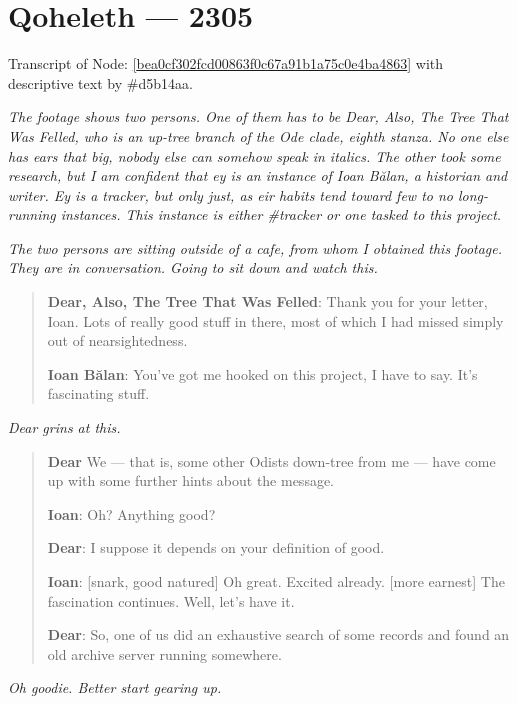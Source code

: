 \hypertarget{qoheleth-2305}{%
\chapter*{Qoheleth — 2305}\label{qoheleth-2305}}

Transcript of Node: \href{http://35.165.134.227/node/bea0cf302fcd00863f0c67a91b1a75c0e4ba4863}{{[}bea0cf302fcd00863f0c67a91b1a75c0e4ba4863{]}} with descriptive text by \#d5b14aa.

\emph{The footage shows two persons. One of them has to be Dear, Also, The Tree That Was Felled, who is an up-tree branch of the Ode clade, eighth stanza. No one else has ears that big, nobody else can somehow speak in italics. The other took some research, but I am confident that ey is an instance of Ioan Bălan, a historian and writer. Ey is a tracker, but only just, as eir habits tend toward few to no long-running instances. This instance is either \#tracker or one tasked to this project.}

\emph{The two persons are sitting outside of a cafe, from whom I obtained this footage. They are in conversation. Going to sit down and watch this.}

\begin{quote}
\textbf{Dear, Also, The Tree That Was Felled}: Thank you for your letter, Ioan. Lots of really good stuff in there, most of which I had missed simply out of nearsightedness.

\textbf{Ioan Bălan}: You've got me hooked on this project, I have to say. It's fascinating stuff.
\end{quote}

\emph{Dear grins at this.}

\begin{quote}
\textbf{Dear} We — that is, some other Odists down-tree from me — have come up with some further hints about the message.

\textbf{Ioan}: Oh? Anything good?

\textbf{Dear}: I suppose it depends on your definition of good.

\textbf{Ioan}: {[}snark, good natured{]} Oh great. Excited already. {[}more earnest{]} The fascination continues. Well, let's have it.

\textbf{Dear}: So, one of us did an exhaustive search of some records and found an old archive server running somewhere.
\end{quote}

\emph{Oh goodie. Better start gearing up.}

